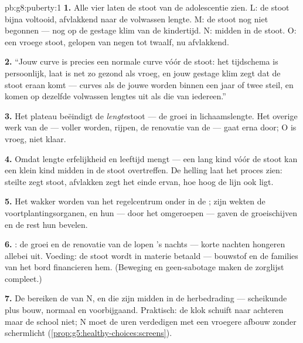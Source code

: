 \begin{solution}{pb:g8:puberty:1}
\textbf{1.} Alle vier laten de stoot van de adolescentie zien. L: de stoot
bijna voltooid, afvlakkend naar de volwassen lengte. M: de stoot nog niet
begonnen --- nog op de gestage klim van de kindertijd. N: midden in de
stoot. O: een vroege stoot, gelopen van negen tot twaalf, nu afvlakkend.

\textbf{2.} ``Jouw curve is precies een normale curve vóór de stoot: het
tijdschema is persoonlijk, laat is net zo gezond als vroeg, en jouw
gestage klim zegt dat de stoot eraan komt --- curves als de jouwe worden
binnen een jaar of twee steil, en komen op dezelfde volwassen lengtes uit
als die van iedereen.''

\textbf{3.} Het plateau beëindigt de \emph{lengte}stoot --- de groei in
lichaamslengte. Het overige werk van de  --- voller worden,
rijpen, de renovatie van de  --- gaat erna door; O is vroeg, niet
klaar.

\textbf{4.} Omdat lengte erfelijkheid en leeftijd mengt --- een lang kind
vóór de stoot kan een klein kind midden in de stoot overtreffen. De
helling laat het proces zien: steilte zegt stoot, afvlakken zegt het einde
ervan, hoe hoog de lijn ook ligt.

\textbf{5.} Het wakker worden van het regelcentrum onder in de ;
zijn  wekten de voortplantingsorganen, en hun  --- door het
 omgeroepen --- gaven de groeischijven en de rest hun bevelen.

\textbf{6.} : de groei en de renovatie van de  lopen 's
nachts --- korte nachten hongeren allebei uit. Voeding: de stoot wordt in
materie betaald --- bouwstof en de families van het bord financieren hem.
(Beweging en geen-sabotage maken de zorglijst compleet.)

\textbf{7.} De  bereiken de  van N, en die  zijn
midden in de herbedrading --- scheikunde plus bouw, normaal en
voorbijgaand. Praktisch: de klok schuift naar achteren maar de school
niet; N moet de uren verdedigen met een vroegere afbouw zonder schermlicht
(\cref{prop:g5:healthy-choices:screens}).


\end{solution}
